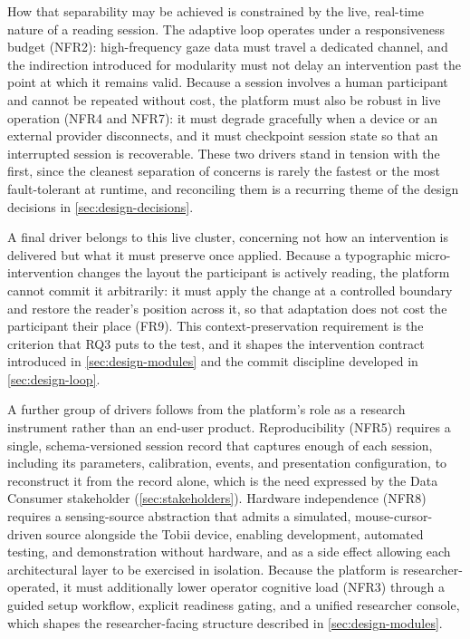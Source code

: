 How that separability may be achieved is constrained by the live, real-time nature of a reading session.
The adaptive loop operates under a responsiveness budget (NFR2): high-frequency gaze data must travel a dedicated channel, and the indirection introduced for modularity must not delay an intervention past the point at which it remains valid.
Because a session involves a human participant and cannot be repeated without cost, the platform must also be robust in live operation (NFR4 and NFR7): it must degrade gracefully when a device or an external provider disconnects, and it must checkpoint session state so that an interrupted session is recoverable.
These two drivers stand in tension with the first, since the cleanest separation of concerns is rarely the fastest or the most fault-tolerant at runtime, and reconciling them is a recurring theme of the design decisions in \cref{sec:design-decisions}.

A final driver belongs to this live cluster, concerning not how an intervention is delivered but what it must preserve once applied.
Because a typographic micro-intervention changes the layout the participant is actively reading, the platform cannot commit it arbitrarily: it must apply the change at a controlled boundary and restore the reader's position across it, so that adaptation does not cost the participant their place (FR9).
This context-preservation requirement is the criterion that RQ3 puts to the test, and it shapes the intervention contract introduced in \cref{sec:design-modules} and the commit discipline developed in \cref{sec:design-loop}.

A further group of drivers follows from the platform's role as a research instrument rather than an end-user product.
Reproducibility (NFR5) requires a single, schema-versioned session record that captures enough of each session, including its parameters, calibration, events, and presentation configuration, to reconstruct it from the record alone, which is the need expressed by the Data Consumer stakeholder (\cref{sec:stakeholders}).
Hardware independence (NFR8) requires a sensing-source abstraction that admits a simulated, mouse-cursor-driven source alongside the Tobii device, enabling development, automated testing, and demonstration without hardware, and as a side effect allowing each architectural layer to be exercised in isolation.
Because the platform is researcher-operated, it must additionally lower operator cognitive load (NFR3) through a guided setup workflow, explicit readiness gating, and a unified researcher console, which shapes the researcher-facing structure described in \cref{sec:design-modules}.


